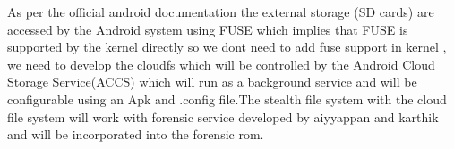  
  
 
  
  As per the official android documentation the external storage (SD cards) are accessed by the Android system using FUSE which implies that FUSE is supported by the kernel directly so we dont need to add fuse support in kernel , we need to develop the cloudfs which will be controlled by the Android Cloud Storage Service(ACCS)  which will run as a background service and will be configurable using an Apk and .config file.The stealth file system with the cloud file system will work with forensic service developed by aiyyappan and karthik and will be incorporated into the forensic rom.
  
  
